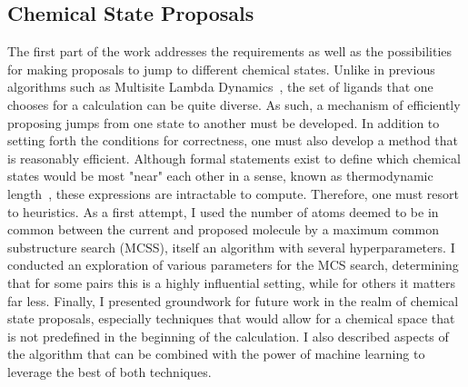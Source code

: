 \subsection{Chemical State Proposals}
%
The first part of the work addresses the requirements as well as the possibilities for making proposals to jump to different chemical states.
%
Unlike in previous algorithms such as Multisite Lambda Dynamics~\cite{Knight2011}, the set of ligands that one chooses for a calculation can be quite diverse.
%
As such, a mechanism of efficiently proposing jumps from one state to another must be developed.
%
In addition to setting forth the conditions for correctness, one must also develop a method that is reasonably efficient.
%
Although formal statements exist to define which chemical states would be most "near" each other in a sense, known as thermodynamic length~\cite{Crooks2007}, these expressions are intractable to compute.
%
Therefore, one must resort to heuristics.
%
As a first attempt, I used the number of atoms deemed to be in common between the current and proposed molecule by a maximum common substructure search (MCSS), itself an algorithm with several hyperparameters.
%
I conducted an exploration of various parameters for the MCS search, determining that for some pairs this is a highly influential setting, while for others it matters far less.
%
Finally, I presented groundwork for future work in the realm of chemical state proposals, especially techniques that would allow for a chemical space that is not predefined in the beginning of the calculation.
%
I also described aspects of the algorithm that can be combined with the power of machine learning to leverage the best of both techniques.
%
